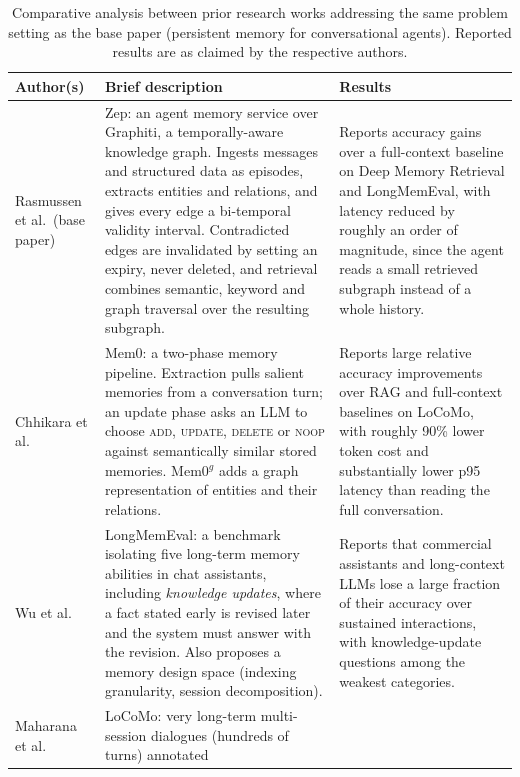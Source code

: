 \documentclass[11pt,a4paper]{article}
\begin{document}
\begin{table}[htbp]
\centering
\caption{Comparative analysis between prior research works addressing the same
problem setting as the base paper (persistent memory for conversational
agents). Reported results are as claimed by the respective authors.}
\label{tab:same}
\small
\begin{tabularx}{\textwidth}{p{2.6cm} X p{3.5cm}}
\toprule
\textbf{Author(s)} & \textbf{Brief description} & \textbf{Results}\\
\midrule
Rasmussen et al.~\cite{rasmussen2025zep}\footnotemark[1] (base paper) &
Zep: an agent memory service over Graphiti, a temporally-aware knowledge graph.
Ingests messages and structured data as episodes, extracts entities and
relations, and gives every edge a bi-temporal validity interval. Contradicted
edges are invalidated by setting an expiry, never deleted, and retrieval
combines semantic, keyword and graph traversal over the resulting subgraph. &
Reports accuracy gains over a full-context baseline on Deep Memory Retrieval
and LongMemEval, with latency reduced by roughly an order of magnitude, since
the agent reads a small retrieved subgraph instead of a whole history.\\
\addlinespace
Chhikara et al.~\cite{chhikara2025mem0}\footnotemark[2] &
Mem0: a two-phase memory pipeline. Extraction pulls salient memories from a
conversation turn; an update phase asks an LLM to choose \textsc{add},
\textsc{update}, \textsc{delete} or \textsc{noop} against semantically similar
stored memories. Mem0$^g$ adds a graph representation of entities and their
relations. &
Reports large relative accuracy improvements over RAG and full-context
baselines on LoCoMo, with roughly 90\% lower token cost and substantially lower
p95 latency than reading the full conversation.\\
\addlinespace
Wu et al.~\cite{wu2024longmemeval}\footnotemark[3] &
LongMemEval: a benchmark isolating five long-term memory abilities in chat
assistants, including \emph{knowledge updates}, where a fact stated early is
revised later and the system must answer with the revision. Also proposes a
memory design space (indexing granularity, session decomposition). &
Reports that commercial assistants and long-context LLMs lose a large fraction
of their accuracy over sustained interactions, with knowledge-update questions
among the weakest categories.\\
\addlinespace
Maharana et al.~\cite{maharana2024locomo}\footnotemark[4] &
LoCoMo: very long-term multi-session dialogues (hundreds of turns) annotated

\end{tabularx}
\end{table}
\end{document}
